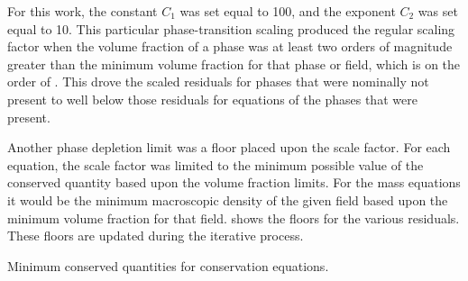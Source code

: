 For this work, the constant $C_1$ was set equal to 100, and the exponent $C_2$ was set equal to 10.
This particular phase-transition scaling produced the regular scaling factor when the volume fraction of a phase was at least two orders of magnitude greater than the minimum volume fraction for that phase or field, which is on the order of .
This drove the scaled residuals for phases that were nominally not present to well below those residuals for equations of the phases that were present.

Another phase depletion limit was a floor placed upon the scale factor.
For each equation, the scale factor was limited to the minimum possible value of the conserved quantity based upon the volume fraction limits.
For the mass equations it would be the minimum macroscopic density of the given field based upon the minimum volume fraction for that field.
 shows the floors for the various residuals.
These floors are updated during the iterative process.

\begin{table}[ht]
\centering
\singlespace

\caption{Minimum conserved quantities for conservation equations.}
\label{tab:minimumConservedValues}
\end{table}



